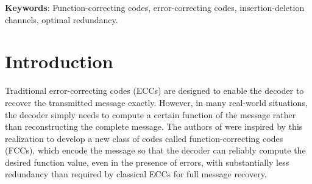 \documentclass[11 pt]{article}
\numberwithin{equation}{section}
\begin{document}
\textbf{Keywords}:
 Function-correcting codes, error-correcting codes, insertion-deletion channels, optimal redundancy.







%




\section{Introduction}
% 
% 
% 
% 

{T}{raditional} error-correcting codes (ECCs) are designed to enable the decoder to recover the transmitted message exactly. However, in many real-world situations, the decoder simply needs to compute a certain function of the message rather than reconstructing the complete message. The authors of \cite{10132545} were inspired by this realization to develop a new class of codes called function-correcting codes (FCCs), which encode the message so that the decoder can reliably compute the desired function value, even in the presence of errors, with substantially less redundancy than required by classical ECCs for full message recovery.
\end{document}
